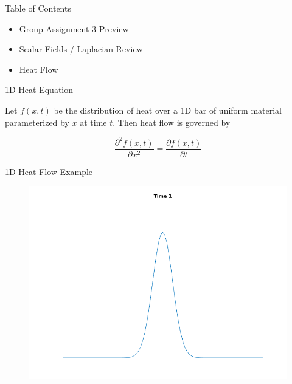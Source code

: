 \documentclass{beamer}
\begin{document}
\begin{frame}{Table of Contents}

\begin{itemize}[label=$\vartriangleright$]
	\item Group Assignment 3 Preview
\end{itemize}

\begin{itemize}[label=$\vartriangleright$]
	\item Scalar Fields / Laplacian Review
\end{itemize}

\begin{itemize}[label=$\blacktriangleright$]
	\item Heat Flow
\end{itemize}

\end{frame}

\begin{frame}{1D Heat Equation}

Let $f(x, t)$ be the distribution of heat over a 1D bar of uniform material parameterized by $x$ at time $t$.  Then heat flow is governed by

\[ \frac{ \partial^2 f(x, t) }{ \partial x^2} = \frac{ \partial f(x, t) }{ \partial t} \]


\end{frame}

\begin{frame}{1D Heat Flow Example}

\begin{figure}[t]
    \includegraphics[width=\textwidth]{1.png}
\end{figure}

\end{frame}
\end{document}
